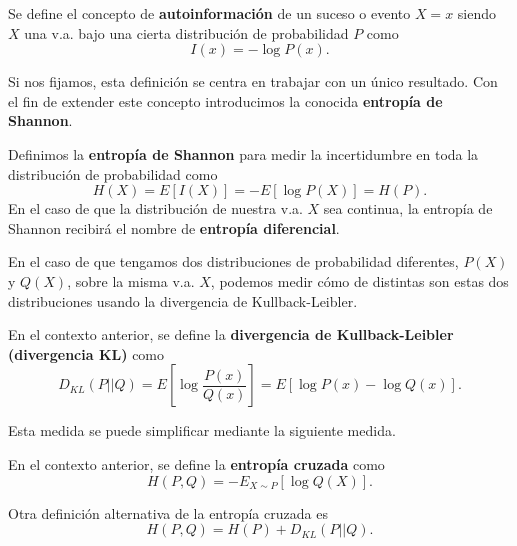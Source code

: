 \begin{definition}
    Se define el concepto de \textbf{autoinformación} de un suceso o evento $X=x$ siendo $X$ una \ac{v.a.} bajo una cierta distribución de probabilidad $P$ como
    \begin{equation}
        I(x) = -\log P(x).
    \end{equation}
\end{definition}

Si nos fijamos, esta definición se centra en trabajar con un único resultado. Con el fin de extender este concepto introducimos la conocida \textbf{entropía de Shannon}.

\begin{definition}
    Definimos la \textbf{entropía de Shannon} para medir la incertidumbre en toda la distribución de probabilidad como
    \begin{equation}
        H(X)=E[I(X)]=-E[\log P(X)] = H(P).
    \end{equation}
    En el caso de que la distribución de nuestra \ac{v.a.} $X$ sea continua, la entropía de Shannon recibirá el nombre de \textbf{entropía diferencial}.
\end{definition}

En el caso de que tengamos dos distribuciones de probabilidad diferentes, $P(X)$ y $Q(X)$, sobre la misma \ac{v.a.} $X$, podemos medir cómo de distintas son estas dos distribuciones usando la divergencia de Kullback-Leibler.

\begin{definition}
    En el contexto anterior, se define la \textbf{divergencia de Kullback-Leibler (divergencia KL)} como
    \begin{equation}
        D_{KL}(P || Q) = E[\log \frac{P(x)}{Q(x)}] = E[\log P(x) - \log Q(x)].
    \end{equation}
\end{definition}

Esta medida se puede simplificar mediante la siguiente medida.

\begin{definition}
    En el contexto anterior, se define la \textbf{entropía cruzada} como
    \begin{equation}
        H(P, Q) = - E_{X \sim P} [\log Q(X)].
    \end{equation}
\end{definition}

\begin{proposition}
    Otra definición alternativa de la entropía cruzada es
    \begin{equation}
        H(P, Q) = H(P) + D_{KL}(P || Q).
    \end{equation}
\end{proposition}

